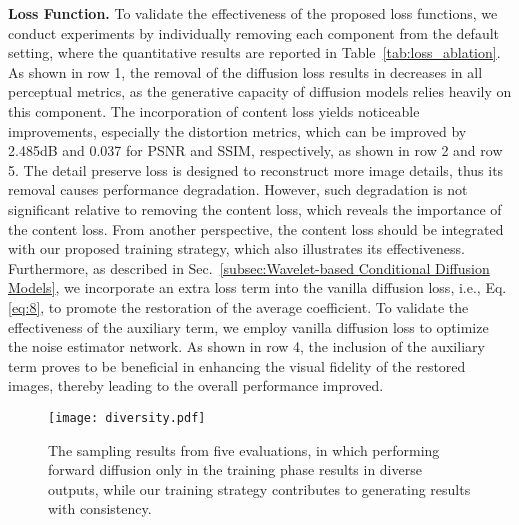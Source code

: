 \textbf{Loss Function.}
To validate the effectiveness of the proposed loss functions, we conduct experiments by individually removing each component from the default setting, where the quantitative results are reported in Table~\ref{tab:loss_ablation}. As shown in row 1, the removal of the diffusion loss  results in decreases in all perceptual metrics, as the generative capacity of diffusion models relies heavily on this component. The incorporation of content loss  yields noticeable improvements, especially the distortion metrics, which can be improved by 2.485dB and 0.037 for PSNR and SSIM, respectively, as shown in row 2 and row 5. The detail preserve loss  is designed to reconstruct more image details, thus its removal causes performance degradation. However, such degradation is not significant relative to removing the content loss, which reveals the importance of the content loss. From another perspective, the content loss should be integrated with our proposed training strategy, which also illustrates its effectiveness. Furthermore, as described in Sec.~\ref{subsec:Wavelet-based Conditional Diffusion Models}, we incorporate an extra loss term into the vanilla diffusion loss, i.e., Eq.\ref{eq:8}, to promote the restoration of the average coefficient. To validate the effectiveness of the auxiliary term, we employ vanilla diffusion loss to optimize the noise estimator network. As shown in row 4, the inclusion of the auxiliary term proves to be beneficial in enhancing the visual fidelity of the restored images, thereby leading to the overall performance improved.
\begin{table}[!t]
	\centering
	\caption{Ablation studies of the training strategy of our wavelet-based conditional diffusion model. The results using default settings are \underline{underlined}.}
	\label{tab:training_ablation}
\end{table}
\begin{figure}[!t]
	\centering
	\texttt{[image: diversity.pdf]}
	\caption{The sampling results from five evaluations, in which performing forward diffusion only in the training phase results in diverse outputs, while our training strategy contributes to generating results with consistency.}
	\label{fig:diversity}
\end{figure}

